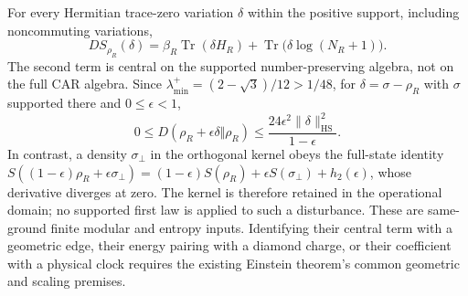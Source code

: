 For every Hermitian trace-zero variation $\delta$ within the positive
support, including noncommuting variations,
\begin{equation}
 DS_{\rho_R}(\delta)=\beta_R\operatorname{Tr}(\delta H_R)
                  +\operatorname{Tr}\bigl(\delta\log(N_R+1)\bigr).
\end{equation}
The second term is central on the supported number-preserving algebra,
not on the full CAR algebra. Since
$\lambda_{\min}^+=(2-\sqrt3)/12>1/48$, for
$\delta=\sigma-\rho_R$ with $\sigma$ supported there and
$0\le\epsilon<1$,
\begin{equation}
 0\le D(\rho_R+\epsilon\delta\Vert\rho_R)
 \le\frac{24\epsilon^2\|\delta\|_{\mathrm{HS}}^2}{1-\epsilon}.
\end{equation}
In contrast, a density $\sigma_\perp$ in the orthogonal kernel
obeys the full-state identity
$S((1-\epsilon)\rho_R+\epsilon\sigma_\perp)
=(1-\epsilon)S(\rho_R)+\epsilon S(\sigma_\perp)+h_2(\epsilon)$,
whose derivative diverges at zero. The kernel is therefore retained in
the operational domain; no supported first law is applied to such a
disturbance. These are same-ground finite modular and entropy inputs.
Identifying their central term with a geometric edge, their energy
pairing with a diamond charge, or their coefficient with a physical
clock requires the existing Einstein theorem's common geometric
and scaling premises.
